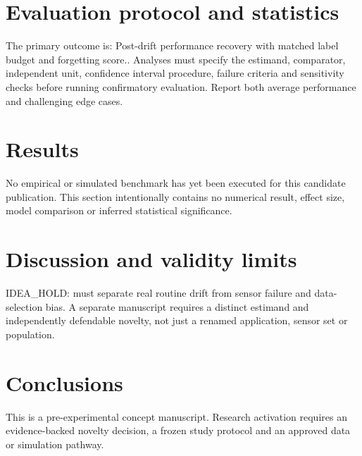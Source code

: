 \documentclass[11pt,a4paper]{article}
\begin{document}
\section{Evaluation protocol and statistics}
The primary outcome is: Post-drift performance recovery with matched label budget and forgetting score.. Analyses must specify the estimand, comparator, independent unit, confidence interval procedure, failure criteria and sensitivity checks before running confirmatory evaluation. Report both average performance and challenging edge cases.
\section{Results}
No empirical or simulated benchmark has yet been executed for this candidate publication. This section intentionally contains no numerical result, effect size, model comparison or inferred statistical significance.
\section{Discussion and validity limits}
IDEA\_HOLD: must separate real routine drift from sensor failure and data-selection bias. A separate manuscript requires a distinct estimand and independently defendable novelty, not just a renamed application, sensor set or population.
\section{Conclusions}
This is a pre-experimental concept manuscript. Research activation requires an evidence-backed novelty decision, a frozen study protocol and an approved data or simulation pathway.
\end{document}

